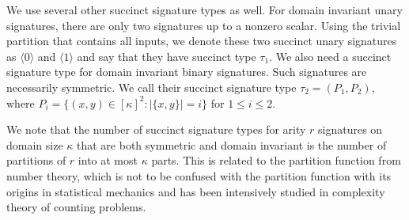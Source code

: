 \documentclass[11pt]{article}
\begin{document}
We use several other succinct signature types as well.
For domain invariant unary signatures,
there are only two signatures up to a nonzero scalar.
Using the trivial partition that contains all inputs,
we denote these two succinct unary signatures as $\langle 0 \rangle$ and $\langle 1 \rangle$ and say that they have succinct type $\tau_1$.
We also need a succinct signature type for domain invariant binary signatures.
Such signatures are necessarily symmetric.
We call their succinct signature type $\tau_2 = (P_1, P_2)$,
where $P_i = \{(x,y) \in [\kappa]^2 : |\{x, y\}| = i\}$ for $1 \le i \le 2$.

We note that the number of succinct signature types for arity $r$ signatures on domain size $\kappa$
that are both symmetric and domain invariant is the number of partitions of $r$ into at most $\kappa$ parts.
This is related to the partition function from number theory,
which is not to be confused with the partition function with its origins in statistical mechanics
and has been intensively studied in complexity theory of counting problems.
\end{document}
